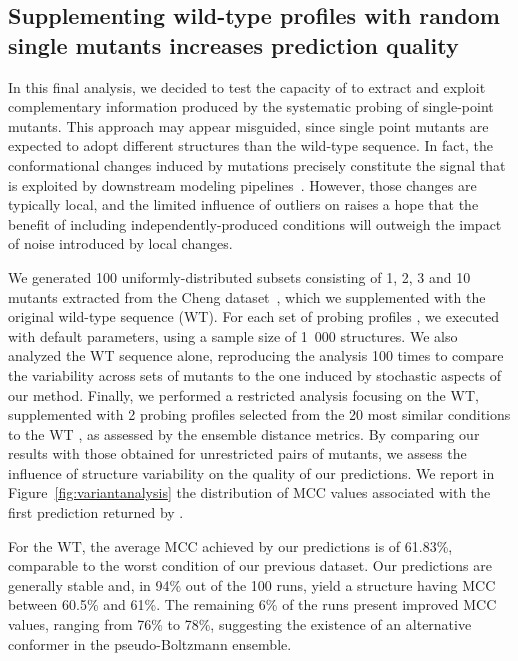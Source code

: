 \documentclass[a4,center,fleqn]{NAR}
\begin{document}
\subsection*{Supplementing wild-type profiles with random single mutants increases prediction quality}
In this final analysis, we decided to test the capacity of \OurTool to extract and exploit complementary information produced by the systematic probing of single-point mutants.
This approach may appear misguided, since single point mutants are expected to adopt different structures than the wild-type sequence. In fact, the conformational changes induced by mutations precisely constitute the signal that is exploited by downstream modeling pipelines~\cite{Cordero2015}. However, those changes are typically local, and the limited influence of outliers on \OurTool{} raises a hope that the benefit of including independently-produced conditions will outweigh the impact of noise introduced by local changes.

We generated 100 uniformly-distributed subsets consisting of 1, 2, 3 and 10 mutants extracted from the Cheng dataset~\cite{Cheng2017}, which we supplemented with the original wild-type sequence (WT).
For each set of probing profiles , we executed \OurTool{} with default parameters, using a sample size of 1~000 structures. 
We also analyzed the WT sequence alone, reproducing the analysis 100 times to compare the variability across sets of mutants to the one induced by stochastic aspects of our method. 
Finally, we performed a restricted analysis focusing on the WT, supplemented with 2 probing profiles selected from the 20 most similar conditions to the WT , as assessed by the ensemble distance metrics. By comparing our results with those obtained for unrestricted pairs of mutants, we assess the influence of structure variability on the quality of our predictions. We report in Figure~\ref{fig:variantanalysis} the distribution of MCC values associated with the first prediction returned by \OurTool.

For the WT, the average MCC achieved by our predictions is of 61.83\%, comparable to the worst condition of our previous dataset.
Our predictions are generally stable and, in 94\% out of the 100 runs, yield a structure having MCC between 60.5\% and 61\%. The remaining 6\% of the runs present improved MCC values, ranging from 76\% to 78\%, suggesting the existence of an alternative conformer in the pseudo-Boltzmann ensemble.
\end{document}
